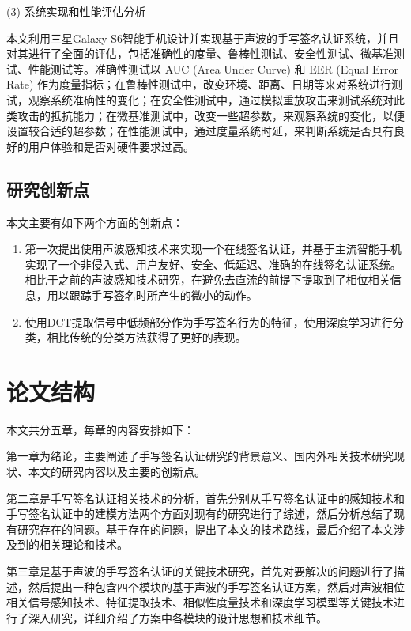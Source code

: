 (3) 系统实现和性能评估分析

本文利用三星Galaxy S6智能手机设计并实现基于声波的手写签名认证系统，并且对其进行了全面的评估，包括准确性的度量、鲁棒性测试、安全性测试、微基准测试、性能测试等。准确性测试以 AUC (Area Under Curve) 和 EER (Equal Error Rate) 作为度量指标；在鲁棒性测试中，改变环境、距离、日期等来对系统进行测试，观察系统准确性的变化；在安全性测试中，通过模拟重放攻击来测试系统对此类攻击的抵抗能力；在微基准测试中，改变一些超参数，来观察系统的变化，以便设置较合适的超参数；在性能测试中，通过度量系统时延，来判断系统是否具有良好的用户体验和是否对硬件要求过高。


\subsection{研究创新点}

本文主要有如下两个方面的创新点：
\begin{enumerate}[label=(\arabic*)]
    \item 第一次提出使用声波感知技术来实现一个在线签名认证，并基于主流智能手机实现了一个非侵入式、用户友好、安全、低延迟、准确的在线签名认证系统。相比于之前的声波感知技术研究，在避免去直流的前提下提取到了相位相关信息，用以跟踪手写签名时所产生的微小的动作。

    \item 使用DCT提取信号中低频部分作为手写签名行为的特征，使用深度学习进行分类，相比传统的分类方法获得了更好的表现。
\end{enumerate}

\section{论文结构}

本文共分五章，每章的内容安排如下：

第一章为绪论，主要阐述了手写签名认证研究的背景意义、国内外相关技术研究现状、本文的研究内容以及主要的创新点。

第二章是手写签名认证相关技术的分析，首先分别从手写签名认证中的感知技术和手写签名认证中的建模方法两个方面对现有的研究进行了综述，然后分析总结了现有研究存在的问题。基于存在的问题，提出了本文的技术路线，最后介绍了本文涉及到的相关理论和技术。

第三章是基于声波的手写签名认证的关键技术研究，首先对要解决的问题进行了描述，然后提出一种包含四个模块的基于声波的手写签名认证方案，然后对声波相位相关信号感知技术、特征提取技术、相似性度量技术和深度学习模型等关键技术进行了深入研究，详细介绍了方案中各模块的设计思想和技术细节。

